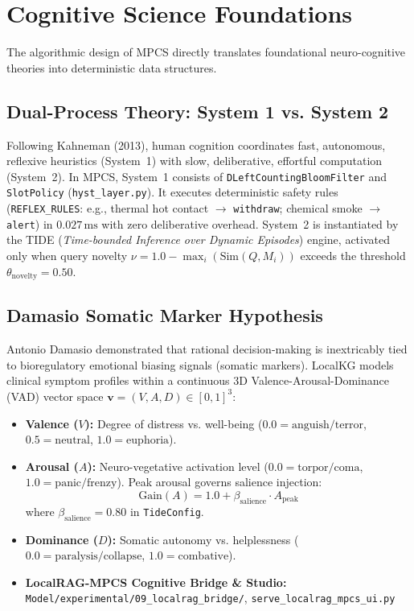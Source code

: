 \documentclass[10pt,twocolumn,letterpaper]{article}
\begin{document}
\section{Cognitive Science Foundations}
The algorithmic design of MPCS directly translates foundational neuro-cognitive theories into deterministic data structures.

\subsection{Dual-Process Theory: System 1 vs. System 2}
Following Kahneman (2013), human cognition coordinates fast, autonomous, reflexive heuristics (System~1) with slow, deliberative, effortful computation (System~2).
In MPCS, System~1 consists of \texttt{DLeftCountingBloomFilter} and \texttt{SlotPolicy} (\texttt{hyst\_layer.py}). It executes deterministic safety rules (\texttt{REFLEX\_RULES}: e.g., thermal hot contact $\rightarrow$ \texttt{withdraw}; chemical smoke $\rightarrow$ \texttt{alert}) in $0.027\,\text{ms}$ with zero deliberative overhead.
System~2 is instantiated by the TIDE (\textit{Time-bounded Inference over Dynamic Episodes}) engine, activated only when query novelty $\nu = 1.0 - \max_i(\text{Sim}(Q, M_i))$ exceeds the threshold $\theta_{\text{novelty}} = 0.50$.

\subsection{Damasio Somatic Marker Hypothesis}
Antonio Damasio demonstrated that rational decision-making is inextricably tied to bioregulatory emotional biasing signals (somatic markers). LocalKG models clinical symptom profiles within a continuous 3D Valence-Arousal-Dominance (VAD) vector space $\mathbf{v} = (V, A, D) \in [0, 1]^3$:
\begin{itemize}
  \item \textbf{Valence ($V$):} Degree of distress vs. well-being ($0.0 = \text{anguish/terror}$, $0.5 = \text{neutral}$, $1.0 = \text{euphoria}$).
  \item \textbf{Arousal ($A$):} Neuro-vegetative activation level ($0.0 = \text{torpor/coma}$, $1.0 = \text{panic/frenzy}$). Peak arousal governs salience injection:
  \begin{equation}
    \text{Gain}(A) = 1.0 + \beta_{\text{salience}} \cdot A_{\text{peak}}
  \end{equation}
  where $\beta_{\text{salience}} = 0.80$ in \texttt{TideConfig}.
  \item \textbf{Dominance ($D$):} Somatic autonomy vs. helplessness ($0.0 = \text{paralysis/collapse}$, $1.0 = \text{combative}$).
  \item \textbf{LocalRAG-MPCS Cognitive Bridge \& Studio:} \nolinkurl{Model/experimental/09_localrag_bridge/}, \nolinkurl{serve_localrag_mpcs_ui.py}
\end{itemize}
\end{document}
